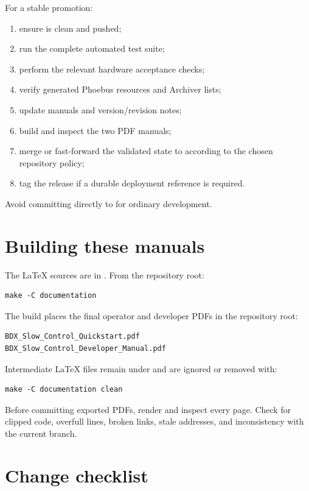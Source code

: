 For a stable promotion:

\begin{enumerate}
  \item ensure  is clean and pushed;
  \item run the complete automated test suite;
  \item perform the relevant hardware acceptance checks;
  \item verify generated Phoebus resources and Archiver lists;
  \item update manuals and version/revision notes;
  \item build and inspect the two PDF manuals;
  \item merge or fast-forward the validated state to  according to the chosen repository policy;
  \item tag the release if a durable deployment reference is required.
\end{enumerate}

Avoid committing directly to  for ordinary development.

\section{Building these manuals}

The LaTeX sources are in . From the repository root:

\begin{lstlisting}[style=shell]
make -C documentation
\end{lstlisting}

The build places the final operator and developer PDFs in the repository root:

\begin{lstlisting}
BDX_Slow_Control_Quickstart.pdf
BDX_Slow_Control_Developer_Manual.pdf
\end{lstlisting}

Intermediate LaTeX files remain under  and are ignored or removed with:

\begin{lstlisting}[style=shell]
make -C documentation clean
\end{lstlisting}

Before committing exported PDFs, render and inspect every page. Check for clipped code, overfull lines, broken links, stale addresses, and inconsistency with the current branch.

\section{Change checklist}


